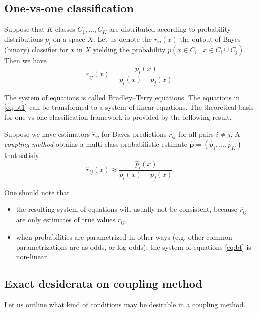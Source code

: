\documentclass[twoside,11pt]{article}
\begin{document}
\subsection{One-vs-one classification }

Suppose that $K$ classes $C_1, \ldots, C_K$ are distributed according to probability distributions $p_i$ on a  space $X$. Let us denote the $r_{ij}(x)$ the output of Bayes (binary) classifier for $x$ in $X$ yielding the probability $p(x \in C_i \mid x\in C_i \cup C_j )$. Then we have
\begin{equation}
r_{ij}(x)= \frac {p_i(x)}{p_i(x) + p_j(x)}. \label{eq:bt1}
\end{equation}


The system of equations is called Bradley--Terry equations.  The equations in \eqref{eq:bt1}  can be transformed to a system of linear equations. The theoretical basis for one-vs-one classification framework is provided by the following result.



Suppose we have estimators $\hat r_{ij}$ for Bayes predictions $r_{ij}$ for all pairs $i\not= j$. A \emph{coupling method} obtains a multi-class probabilistic estimate $\boldsymbol{\hat p}= (\hat p_1, \ldots, \hat p_K)$ that satisfy
\begin{equation}
	\hat{r}_{ij}(x) \approx \frac {\hat p_i(x)}{\hat p_i(x) + \hat p_j(x)}. \label{eq:bt2}
\end{equation}

 One should note that 
\begin{itemize}
\item the resulting system of equations will usually not be consistent, because $\hat{r}_{ij}$ are only estimates of true values $r_{ij}$,
\item when probabilities are parametrized in other ways (e.g. other common parametrizations are as odds, or log-odds), the system of equations \eqref{eq:bt} is non-linear.
\end{itemize}

\subsection{Exact desiderata on coupling method}

Let us outline what kind of conditions may be desirable in a coupling method.
\end{document}
